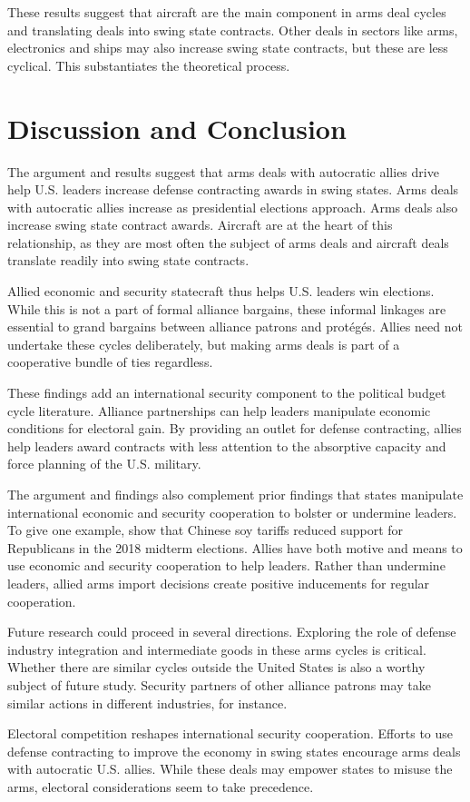 \documentclass[12pt]{article}
\begin{document}
These results suggest that aircraft are the main component in arms deal cycles and translating deals into swing state contracts. 
Other deals in sectors like arms, electronics and ships may also increase swing state contracts, but these are less cyclical. 
This substantiates the theoretical process. 



\section{Discussion and Conclusion}


The argument and results suggest that arms deals with autocratic allies drive help U.S. leaders increase defense contracting awards in swing states. 
Arms deals with autocratic allies increase as presidential elections approach. 
Arms deals also increase swing state contract awards. 
Aircraft are at the heart of this relationship, as they are most often the subject of arms deals and aircraft deals translate readily into swing state contracts. 


Allied economic and security statecraft thus helps U.S. leaders win elections. 
While this is not a part of formal alliance bargains, these informal linkages are essential to grand bargains between alliance patrons and prot{\'e}g{\'e}s.
Allies need not undertake these cycles deliberately, but making arms deals is part of a cooperative bundle of ties regardless.


These findings add an international security component to the political budget cycle literature.
Alliance partnerships can help leaders manipulate economic conditions for electoral gain. 
By providing an outlet for defense contracting, allies help leaders award contracts with less attention to the absorptive capacity and force planning of the U.S. military.


The argument and findings also complement prior findings that states manipulate international economic and security cooperation to bolster or undermine leaders. 
To give one example, \citet{ChyzhUrbatsch2021} show that Chinese soy tariffs reduced support for Republicans in the 2018 midterm elections. 
Allies have both motive and means to use economic and security cooperation to help leaders. 
Rather than undermine leaders, allied arms import decisions create positive inducements for regular cooperation.


Future research could proceed in several directions. 
Exploring the role of defense industry integration and intermediate goods in these arms cycles is critical.
Whether there are similar cycles outside the United States is also a worthy subject of future study. 
Security partners of other alliance patrons may take similar actions in different industries, for instance.


Electoral competition reshapes international security cooperation.
Efforts to use defense contracting to improve the economy in swing states encourage arms deals with autocratic U.S. allies.
While these deals may empower states to misuse the arms, electoral considerations seem to take precedence. 


\newpage
\singlespace
 
 
\end{document}
